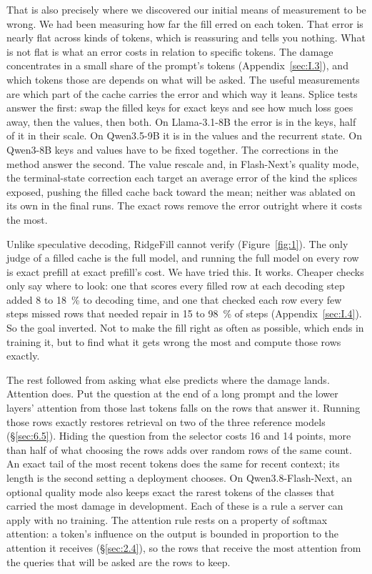 \documentclass[11pt]{article}
\begin{document}
That is also precisely where we discovered our initial means of measurement to be wrong. We had been measuring how far the fill erred on each token. That error is nearly flat across kinds of tokens, which is reassuring and tells you nothing. What is not flat is what an error costs in relation to specific tokens. The damage concentrates in a small share of the prompt's tokens (Appendix~\ref{sec:I.3}), and which tokens those are depends on what will be asked. The useful measurements are which part of the cache carries the error and which way it leans. Splice tests answer the first: swap the filled keys for exact keys and see how much loss goes away, then the values, then both. On Llama-3.1-8B the error is in the keys, half of it in their scale. On Qwen3.5-9B it is in the values and the recurrent state. On Qwen3-8B keys and values have to be fixed together. The corrections in the method answer the second. The value rescale and, in Flash-Next's quality mode, the terminal-state correction each target an average error of the kind the splices exposed, pushing the filled cache back toward the mean; neither was ablated on its own in the final runs. The exact rows remove the error outright where it costs the most.

Unlike speculative decoding, RidgeFill cannot verify (Figure~\ref{fig:1}). The only judge of a filled cache is the full model, and running the full model on every row is exact prefill at exact prefill's cost. We have tried this. It works. Cheaper checks only say where to look: one that scores every filled row at each decoding step added 8 to 18~\% to decoding time, and one that checked each row every few steps missed rows that needed repair in 15 to 98~\% of steps (Appendix~\ref{sec:I.4}). So the goal inverted. Not to make the fill right as often as possible, which ends in training it, but to find what it gets wrong the most and compute those rows exactly.

The rest followed from asking what else predicts where the damage lands. Attention does. Put the question at the end of a long prompt and the lower layers' attention from those last tokens falls on the rows that answer it. Running those rows exactly restores retrieval on two of the three reference models (\S\ref{sec:6.5}). Hiding the question from the selector costs 16 and 14 points, more than half of what choosing the rows adds over random rows of the same count. An exact tail of the most recent tokens does the same for recent context; its length is the second setting a deployment chooses. On Qwen3.8-Flash-Next, an optional quality mode also keeps exact the rarest tokens of the classes that carried the most damage in development. Each of these is a rule a server can apply with no training. The attention rule rests on a property of softmax attention: a token's influence on the output is bounded in proportion to the attention it receives (\S\ref{sec:2.4}), so the rows that receive the most attention from the queries that will be asked are the rows to keep.
\end{document}
